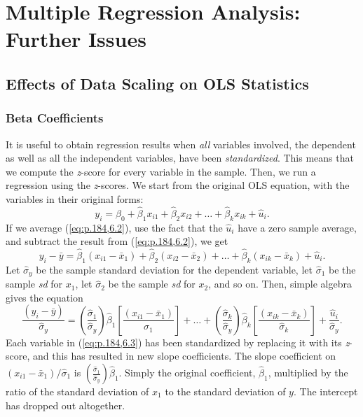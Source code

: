 \documentclass[a4paper, 10pt]{article}
\theoremstyle{definition}	%
\begin{document}
\section{Multiple Regression Analysis: Further Issues}
\setcounter{equation}{0}
\setcounter{theorem}{0}
\setcounter{assumption}{0}
\subsection{Effects of Data Scaling on OLS Statistics}
\subsubsection{Beta Coefficients}
It is useful to obtain regression results when \textit{all} variables involved, the dependent as well as all the independent variables, have been \textit{standardized}. 
This means that we compute the \textit{z}-score for every variable in the sample. Then, we run a regression using the \textit{z}-scores. We start from the original OLS equation, with the variables in their original forms:
\begin{equation}
    y_i = \hat{\beta}_0 + \hat{\beta}_1 x_{i1} + \hat{\beta}_2 x_{i2} + \dots + \hat{\beta}_k x_{ik} + \hat{u}_i. \label{eq:p.184,6.2}
\end{equation}
If we average (\ref{eq:p.184,6.2}), use the fact that the $\hat{u}_i$ have a zero sample average, and subtract the result from (\ref{eq:p.184,6.2}), we get
\begin{equation*}
    y_i - \bar{y} = \hat{\beta}_1 (x_{i1} - \bar{x}_1) + \hat{\beta}_2 (x_{i2} - \bar{x}_2) + \dots + \hat{\beta}_k (x_{ik} - \bar{x}_k) + \hat{u}_i.
\end{equation*}
Let $\hat{\sigma}_y$ be the sample standard deviation for the dependent variable, let $\hat{\sigma}_1$ be the sample \textit{sd} for $x_1$, let $\hat{\sigma}_2$ be the sample \textit{sd} for $x_2$, and so on. Then, simple algebra gives the equation
\begin{equation}
    \frac{(y_i - \bar{y})}{\hat{\sigma}_y} = \left( \frac{\hat{\sigma}_1}{\hat{\sigma}_y} \right) \hat{\beta}_1 \left[ \frac{(x_{i1} - \bar{x}_1)}{\hat{\sigma}_1} \right] + \dots + \left( \frac{\hat{\sigma}_k}{\hat{\sigma}_y} \right) \hat{\beta}_k \left[ \frac{(x_{ik} - \bar{x}_k)}{\hat{\sigma}_k} \right] + \frac{\hat{u}_i}{\hat{\sigma}_y}.
    \label{eq:p.184,6.3}
\end{equation}
Each variable in (\ref{eq:p.184,6.3}) has been standardized by replacing it with its \textit{z}-score, and this has resulted in new slope coefficients. The slope coefficient on $(x_{i1} - \bar{x}_1)/\hat{\sigma}_1$ is $\left( \frac{\hat{\sigma}_1}{\hat{\sigma}_y} \right) \hat{\beta}_1$. Simply the original coefficient, $\hat{\beta}_1$, multiplied by the ratio of the standard deviation of $x_1$ to the standard deviation of $y$. The intercept has dropped out altogether.\\
\end{document}

